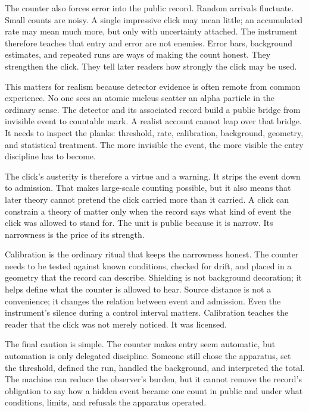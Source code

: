 The counter also forces error into the public record. Random arrivals fluctuate.
Small counts are noisy. A single impressive click may mean little; an
accumulated rate may mean much more, but only with uncertainty attached. The
instrument therefore teaches that entry and error are not enemies. Error bars,
background estimates, and repeated runs are ways of making the count
honest. They strengthen the click. They tell later readers how strongly
the click may be used.

This matters for realism because detector evidence is often remote from common
experience. No one sees an atomic nucleus scatter an alpha particle in the
ordinary sense. The detector and its associated record build a public bridge
from invisible event to countable mark. A realist account cannot leap over
that bridge. It needs to inspect the planks: threshold, rate, calibration,
background, geometry, and statistical treatment. The more invisible the
event, the more visible the entry discipline has to become.

The click's austerity is therefore a virtue and a warning. It strips the event
down to admission. That makes large-scale counting possible, but it also means
that later theory cannot pretend the click carried more than it carried. A click
can constrain a theory of matter only when the record says what kind of event
the click was allowed to stand for. The unit is public because it is narrow.
Its narrowness is the price of its strength.

Calibration is the ordinary ritual that keeps the narrowness honest. The
counter needs to be tested against known conditions, checked for drift, and placed
in a geometry that the record can describe. Shielding is not background
decoration; it helps define what the counter is allowed to hear. Source
distance is not a convenience; it changes the relation between event and
admission. Even the instrument's silence during a control interval matters.
Calibration teaches the reader that the click was not merely noticed. It was
licensed.

The final caution is simple. The counter makes entry seem automatic, but
automation is only delegated discipline. Someone still chose the apparatus,
set the threshold, defined the run, handled the background, and interpreted
the total. The machine can reduce the observer's burden, but it cannot
remove the record's obligation to say how a hidden event became one count
in public and under what conditions, limits, and refusals the apparatus
operated.

